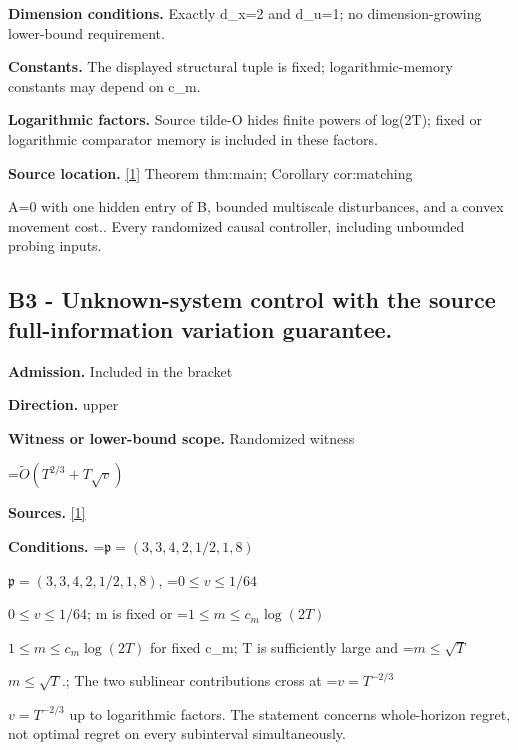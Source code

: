 \documentclass[10pt,a4paper]{article}
\newcommand{\AtlasMath}[1]{\par\begingroup\centering\setbox0=\hbox{$\displaystyle #1$}\ifdim\wd0>1.4\linewidth\typeout{ATLAS WIDE FORMULA: \the\wd0}\fi\ifdim\wd0>\linewidth\resizebox{\linewidth}{!}{\box0}\else\box0\fi\par\endgroup}
\newcommand{\AtlasInlineMath}[1]{\begingroup\setbox0=\hbox{$#1$}\ifdim\wd0>.4\linewidth\endgroup\AtlasMath{#1}\else\endgroup$#1$\fi}
\begin{document}
\textbf{Dimension conditions.} Exactly d\_x=2 and d\_u=1; no dimension-growing lower-bound requirement.



\textbf{Constants.} The displayed structural tuple is fixed; logarithmic-memory constants may depend on c\_m.



\textbf{Logarithmic factors.} Source tilde-O hides finite powers of log(2T); fixed or logarithmic comparator memory is included in these factors.



\textbf{Source location.} \href{https://github.com/WU-Wendao/Colombo/blob/main/colombo_sensorium/Complexity_altas/data/sources/colombo/Q6/manuscript.pdf}{[1]} Theorem thm:main; Corollary cor:matching



A=0 with one hidden entry of B, bounded multiscale disturbances, and a convex movement cost.. Every randomized causal controller, including unbounded probing inputs.



\subsection{B3 - Unknown-system control with the source full-information variation guarantee.}


\textbf{Admission.} Included in the bracket



\textbf{Direction.} upper



\textbf{Witness or lower-bound scope.} Randomized witness



\AtlasMath{\widetilde O(T^{2/3}+T\sqrt v)}


\textbf{Sources.} \href{https://github.com/WU-Wendao/Colombo/blob/main/colombo_sensorium/Complexity_altas/data/sources/colombo/Q6/manuscript.pdf}{[1]}



\textbf{Conditions.} \AtlasInlineMath{\mathfrak p=(3,3,4,2,1/2,1,8)}, \AtlasInlineMath{0\le v\le1/64}; m is fixed or \AtlasInlineMath{1\le m\le c_m\log(2T)} for fixed c\_m; T is sufficiently large and \AtlasInlineMath{m\le\sqrt T}.; The two sublinear contributions cross at \AtlasInlineMath{v=T^{-2/3}} up to logarithmic factors. The statement concerns whole-horizon regret, not optimal regret on every subinterval simultaneously.
\end{document}
